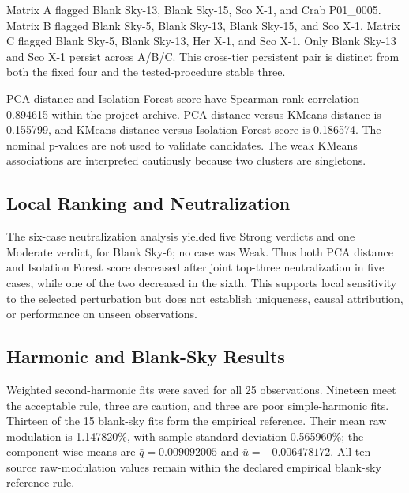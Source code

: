 \documentclass[conference]{IEEEtran}
\begin{document}
Matrix A flagged Blank Sky-13, Blank Sky-15, Sco X-1, and Crab P01\_0005. Matrix B flagged Blank Sky-5, Blank Sky-13, Blank Sky-15, and Sco X-1. Matrix C flagged Blank Sky-5, Blank Sky-13, Her X-1, and Sco X-1. Only Blank Sky-13 and Sco X-1 persist across A/B/C. This cross-tier persistent pair is distinct from both the fixed four and the tested-procedure stable three.


PCA distance and Isolation Forest score have Spearman rank correlation 0.894615 within the project archive. PCA distance versus KMeans distance is 0.155799, and KMeans distance versus Isolation Forest score is 0.186574. The nominal p-values are not used to validate candidates. The weak KMeans associations are interpreted cautiously because two clusters are singletons.


\subsection{Local Ranking and Neutralization}

The six-case neutralization analysis yielded five Strong verdicts and one Moderate verdict, for Blank Sky-6; no case was Weak. Thus both PCA distance and Isolation Forest score decreased after joint top-three neutralization in five cases, while one of the two decreased in the sixth. This supports local sensitivity to the selected perturbation but does not establish uniqueness, causal attribution, or performance on unseen observations.


\subsection{Harmonic and Blank-Sky Results}

Weighted second-harmonic fits were saved for all 25 observations. Nineteen meet the acceptable rule, three are caution, and three are poor simple-harmonic fits. Thirteen of the 15 blank-sky fits form the empirical reference. Their mean raw modulation is 1.147820\%, with sample standard deviation 0.565960\%; the component-wise means are $\bar q=0.009092005$ and $\bar u=-0.006478172$. All ten source raw-modulation values remain within the declared empirical blank-sky reference rule.
\end{document}
